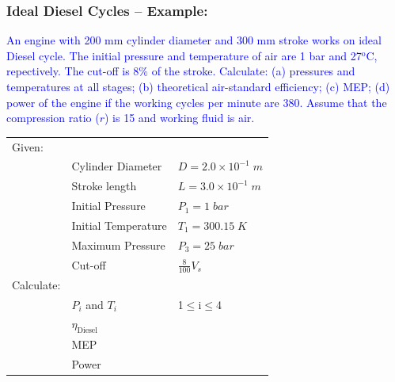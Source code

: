 \documentclass[10pt,compress]{beamer}
\begin{document}
\begin{frame}
 \frametitle{Ideal Diesel Cycles -- Example:}
\textcolor{blue}{An engine with 200 mm cylinder diameter and 300 mm stroke works on ideal Diesel cycle. The initial pressure and temperature of air are 1 bar and 27$^{\text{o}}$C, repectively. The cut-off is 8$\%$ of the stroke. Calculate: (a) pressures and temperatures at all stages; (b) theoretical air-standard efficiency; (c) MEP; (d) power of the engine if the working cycles per minute are 380. Assume that the compression ratio ($r$) is 15 and working fluid is air.}

\medskip

\begin{tabular}{l l l}
Given:    &                  &            \\
          & Cylinder Diameter& $D = 2.0\times 10^{-1}\;m$  \\
          & Stroke length    & $L = 3.0\times 10^{-1}\;m$ \\
          & Initial Pressure & $P_{1}= 1\;bar$   \\
          & Initial Temperature & $T_{1}=300.15\;K$ \\
          & Maximum Pressure & $P_{3}=25\;bar$\\
          & Cut-off          & $\displaystyle\frac{8}{100}V_{s}$ \\
Calculate:&                  & \\
          & $P_{i}$ and $T_{i}$ & 1$\leq$i$\leq$4 \\
          & $\eta_{\text{Diesel}}$ & \\
          & MEP              & \\
          & Power            & \\
\end{tabular}

\end{frame}
\end{document}
